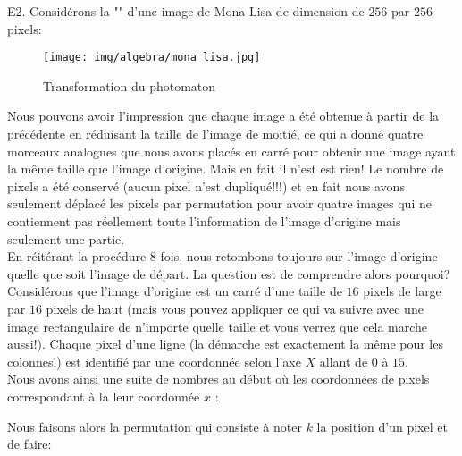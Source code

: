	\pagebreak
	\begin{tcolorbox}[colframe=black,colback=white,sharp corners]
	E2. Considérons la "" d'une image de Mona Lisa de dimension de $256$ par $256$ pixels:
	\begin{figure}[H]
		\centering
		\texttt{[image: img/algebra/mona\_lisa.jpg]}
		\caption{Transformation du photomaton}
	\end{figure}
	Nous pouvons avoir l'impression que chaque image a été obtenue à partir de la précédente en réduisant la taille de l'image de moitié, ce qui a donné quatre morceaux analogues que nous avons placés en carré pour obtenir une image ayant la même taille que l'image d'origine. Mais en fait il n'est est rien! Le nombre de pixels a été conservé (aucun pixel n'est dupliqué!!!) et en fait nous avons seulement déplacé les pixels par permutation pour avoir quatre images qui ne contiennent pas réellement toute l'information de l'image d'origine mais seulement une partie. \\
	
	En réitérant la procédure $8$ fois, nous retombons toujours sur l'image d'origine quelle que soit l'image de départ. La question est de comprendre alors pourquoi?\\
	
	Considérons que l'image d'origine est un carré d'une taille de $16$ pixels de large par $16$ pixels de haut (mais vous pouvez appliquer ce qui va suivre avec une image rectangulaire de n'importe quelle taille et vous verrez que cela marche aussi!). Chaque pixel d'une ligne (la démarche est exactement la même pour les colonnes!) est identifié par une coordonnée selon l'axe $X$ allant de $0$ à $15$.\\
	
	Nous avons ainsi une suite de nombres au début où les coordonnées de pixels correspondant à la leur coordonnée $x$ :
	
	Nous faisons alors la permutation qui consiste à noter $k$ la position d'un pixel et de faire:
	
	\end{tcolorbox}

